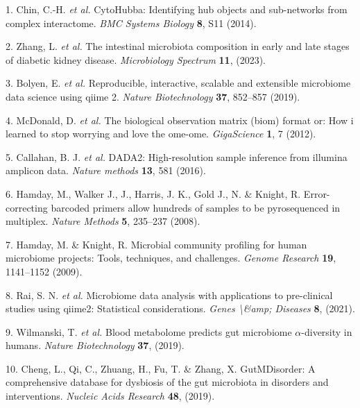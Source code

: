 \documentclass[
]{article}
\newenvironment{cslreferences}%
  {}%
  {\par}
\begin{document}
\hypertarget{refs}{}
\begin{cslreferences}
\leavevmode\hypertarget{ref-CytohubbaIdenChin2014}{}%
1. Chin, C.-H. \emph{et al.} CytoHubba: Identifying hub objects and sub-networks from complex interactome. \emph{BMC Systems Biology} \textbf{8}, S11 (2014).

\leavevmode\hypertarget{ref-TheIntestinalZhang2023}{}%
2. Zhang, L. \emph{et al.} The intestinal microbiota composition in early and late stages of diabetic kidney disease. \emph{Microbiology Spectrum} \textbf{11}, (2023).

\leavevmode\hypertarget{ref-ReproducibleIBolyen2019}{}%
3. Bolyen, E. \emph{et al.} Reproducible, interactive, scalable and extensible microbiome data science using qiime 2. \emph{Nature Biotechnology} \textbf{37}, 852--857 (2019).

\leavevmode\hypertarget{ref-TheBiologicalMcdona2012}{}%
4. McDonald, D. \emph{et al.} The biological observation matrix (biom) format or: How i learned to stop worrying and love the ome-ome. \emph{GigaScience} \textbf{1}, 7 (2012).

\leavevmode\hypertarget{ref-Dada2HighResCallah2016}{}%
5. Callahan, B. J. \emph{et al.} DADA2: High-resolution sample inference from illumina amplicon data. \emph{Nature methods} \textbf{13}, 581 (2016).

\leavevmode\hypertarget{ref-ErrorCorrectinHamday2008}{}%
6. Hamday, M., Walker J., J., Harris, J. K., Gold J., N. \& Knight, R. Error-correcting barcoded primers allow hundreds of samples to be pyrosequenced in multiplex. \emph{Nature Methods} \textbf{5}, 235--237 (2008).

\leavevmode\hypertarget{ref-MicrobialCommuHamday2009}{}%
7. Hamday, M. \& Knight, R. Microbial community profiling for human microbiome projects: Tools, techniques, and challenges. \emph{Genome Research} \textbf{19}, 1141--1152 (2009).

\leavevmode\hypertarget{ref-MicrobiomeDataRaiS2021}{}%
8. Rai, S. N. \emph{et al.} Microbiome data analysis with applications to pre-clinical studies using qiime2: Statistical considerations. \emph{Genes \textbackslash\&amp; Diseases} \textbf{8}, (2021).

\leavevmode\hypertarget{ref-BloodMetabolomWilman2019}{}%
9. Wilmanski, T. \emph{et al.} Blood metabolome predicts gut microbiome \(\alpha\)-diversity in humans. \emph{Nature Biotechnology} \textbf{37}, (2019).

\leavevmode\hypertarget{ref-GutmdisorderACheng2019}{}%
10. Cheng, L., Qi, C., Zhuang, H., Fu, T. \& Zhang, X. GutMDisorder: A comprehensive database for dysbiosis of the gut microbiota in disorders and interventions. \emph{Nucleic Acids Research} \textbf{48}, (2019).


\end{cslreferences}
\end{document}
